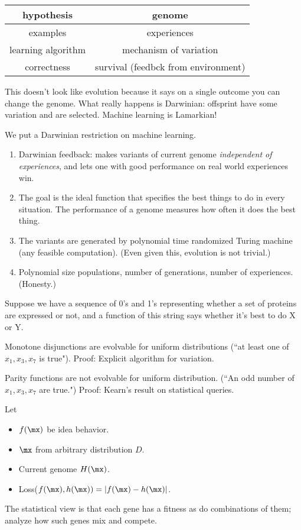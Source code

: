 \begin{tabular}{|c|c|}
\hline 
hypothesis & genome\tabularnewline
\hline 
examples & experiences \tabularnewline
\hline 
learning algorithm & mechanism of variation\tabularnewline
\hline 
correctness  & survival (feedbck from environment) \tabularnewline
\hline 
\end{tabular}


This doesn't look like evolution because it says on a single outcome you can change the genome. What really happens is Darwinian: offsprint have some variation and are selected. Machine learning is Lamarkian!

We put a Darwinian restriction on machine learning.
\begin{enumerate}
\item
Darwinian feedback: makes variants of current genome {\it independent of experiences}, and lets one with good performance on real world experiences win.
\item
The goal is the ideal function that specifies the best things to do in every situation. The performance of a genome measures how often it does the best thing.
\item The variants are generated by polynomial time randomized Turing machine (any feasible computation). (Even given this, evolution is not trivial.)
\item Polynomial size populations, number of generations, number of experiences. (Honesty.)
\end{enumerate}

Suppose we have a sequence of 0's and 1's representing whether a set of proteins are expressed or not, and a function of this string says whether it's best to do X or Y.

Monotone disjunctions are evolvable for uniform distributions (``at least one of $x_1,x_3,x_7$ is true"). Proof: Explicit algorithm for variation.

Parity functions are not evolvable for uniform distribution. (``An odd number of $x_1,x_3,x_7$ are true.") Proof: Kearn's result on statistical queries.

Let
\begin{itemize}
\item
$f(\mx)$ be idea behavior.
\item 
$\mx$ from arbitrary distribution $D$.
\item
Current genome $H(\mx)$.
\item
Loss($f(\mx),h(\mx))=|f(\mx)-h(\mx)|$.
\end{itemize}
The statistical view is that each gene has a fitness as do combinations of them; analyze how such genes mix and compete.


